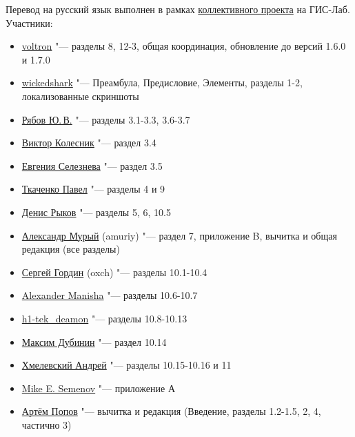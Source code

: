 Перевод на русский язык выполнен в рамках
\href{http://gis-lab.info/docs/qgis/manual15.html}{коллективного проекта}
на ГИС-Лаб. Участники:
\begin{itemize}[label=--]
\item \href{http://gis-lab.info/forum/memberlist.php?mode=viewprofile&u=5325}{voltron}
"--- разделы 8, 12-3, общая координация, обновление до версий 1.6.0 и 1.7.0
\item \href{http://gis-lab.info/forum/memberlist.php?mode=viewprofile&u=7967}{wickedshark}
"--- Преамбула, Предисловие, Элементы, разделы 1-2, локализованные скриншоты
\item \href{http://gis-lab.info/forum/memberlist.php?mode=viewprofile&u=7619}{Рябов Ю.\,В.}
"--- разделы 3.1-3.3, 3.6-3.7
\item \href{http://gis-lab.info/forum/memberlist.php?mode=viewprofile&u=9954}{Виктор Колесник}
"--- раздел 3.4
\item \href{http://gis-lab.info/forum/memberlist.php?mode=viewprofile&u=7392}{Евгения Селезнева}
"--- раздел 3.5
\item \href{http://gis-lab.info/forum/memberlist.php?mode=viewprofile&u=8193}{Ткаченко Павел}
"--- разделы 4 и 9
\item \href{http://gis-lab.info/forum/memberlist.php?mode=viewprofile&u=6901}{Денис Рыков}
"--- разделы 5, 6, 10.5
\item \href{http://gis-lab.info/forum/memberlist.php?mode=viewprofile&u=8430}{Александр Мурый} (amuriy)
"--- раздел 7, приложение B, вычитка и общая редакция (все разделы)
\item \href{http://gis-lab.info/forum/memberlist.php?mode=viewprofile&u=9129}{Сергей Гордин} (oxch)
"--- разделы 10.1-10.4
\item \href{http://gis-lab.info/forum/memberlist.php?mode=viewprofile&u=1394}{Alexander Manisha}
"--- разделы 10.6-10.7
\item \href{http://gis-lab.info/forum/memberlist.php?mode=viewprofile&u=9850}{h1-tek\_deamon}
"--- разделы 10.8-10.13
\item \href{http://gis-lab.info/forum/memberlist.php?mode=viewprofile&u=2}{Максим Дубинин}
"--- раздел 10.14
\item \href{http://gis-lab.info/forum/memberlist.php?mode=viewprofile&u=9719}{Хмелевский Андрей}
"--- разделы 10.15-10.16 и 11
\item \href{http://gis-lab.info/forum/memberlist.php?mode=viewprofile&u=9876}{Mike E. Semenov}
"--- приложение А
\item \href{http://gis-lab.info/forum/memberlist.php?mode=viewprofile&u=7246}{Артём Попов}
"--- вычитка и редакция (Введение, разделы 1.2-1.5, 2, 4, частично 3)
\end{itemize}

